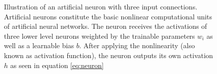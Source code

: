 \begin{figure}[H]
    \centering
{}
\caption[Illustration of an artificial neuron with three input connections]{Illustration of an artificial neuron with three input connections. Artificial neurons constitute the basic nonlinear computational units of artificial neural networks. The neuron receives the activations of three lower level neurons weighted by the trainable parameters $w_i$ as well as a learnable bias $b$. After applying the nonlinearity (also known as activation function), the neuron outputs its own activation $h$ as seen in equation  \ref{eq:neuron}}\label{fig:neuron}
\end{figure}\newpage\noindent
